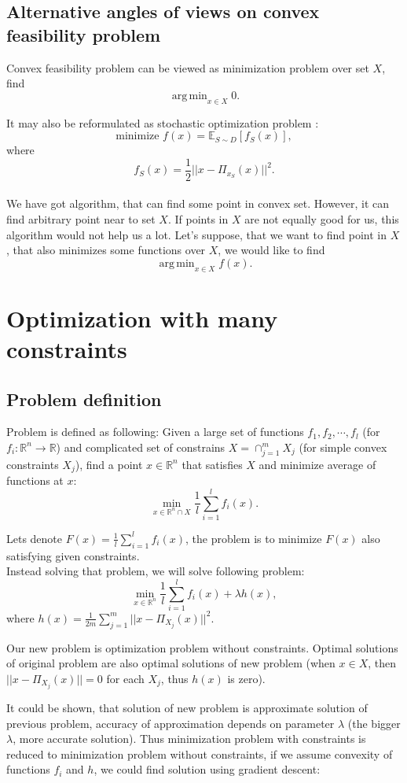 \documentclass[11pt]{book}
\newcommand{\R}{\mathbb{R}}
\newcommand{\E}{\mathbb{E}}
\DeclareMathOperator*{\argmin}{arg\,min}
\begin{document}
\section{Alternative angles of views on convex feasibility problem}
Convex feasibility problem can be viewed as minimization problem over set $X$, find $$\argmin_{x \in X} 0.$$

It may also be reformulated as stochastic optimization problem \cite{sketchAndProject}: $$\text{minimize } f(x)=\E_{S \sim D}[f_S(x)],$$ where $$f_S(x) = \frac{1}{2}||x-\Pi_{x_S}(x)||^2.$$\\


We have got algorithm, that can find some point in convex set. However, it can find arbitrary point near to set $X$. If points in $X$ are not equally good for us, this algorithm would not help us a lot. Let's suppose, that we want to find point in $X$, that also minimizes some functions over $X$, we would like to find $$\argmin_{x \in X} f(x).$$


\chapter{Optimization with many constraints}

\section{Problem definition}
Problem is defined as following: Given a large set of functions $f_1,f_2,\cdots,f_l$ (for $f_i: \R^n \rightarrow \R$) and complicated set of constrains $X = \cap_{j=1}^m X_j$ (for simple convex constraints $X_j$), find a point $x \in \R^n$ that satisfies $X$ and minimize average of functions at $x$: $$ \min_{x \in \R^n \cap X} \frac{1}{l}\sum_{i=1}^l f_i(x).$$

Lets denote $F(x)=\frac{1}{l}\sum_{i=1}^l f_i(x)$, the problem is to minimize $F(x)$ also satisfying given constraints.\\

Instead solving that problem, we will solve following problem:
$$ \min_{x \in \R^n} \frac{1}{l}\sum_{i=1}^l f_i(x) + \lambda h(x),$$
where $h(x)=\frac{1}{2m}\sum_{j=1}^m ||x-\Pi_{X_j}(x)||^2$.

Our new problem is optimization problem without constraints.
Optimal solutions of original problem are also optimal solutions of new problem (when $x \in X$, then $||x-\Pi_{X_j}(x)||=0$ for each $X_j$, thus $h(x)$ is zero).

It could be shown, that solution of new problem is approximate solution of previous problem, accuracy of approximation depends on parameter $\lambda$ (the bigger $\lambda$, more accurate solution). Thus minimization problem with constraints is reduced to minimization problem without constraints, if we assume convexity of functions $f_i$ and $h$, we could find solution using gradient descent:\\
\end{document}
